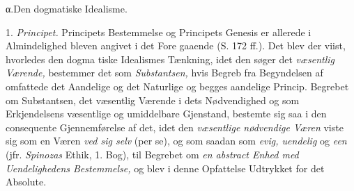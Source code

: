 %
\begin{center}α.\enspace Den dogmatiske Idealisme.\end{center}

1. \emph{Principet.} Principets Bestemmelse og Principets
Genesis er allerede i Almindelighed bleven angivet i det Fore\-%
gaaende (S. 172 ff.). Det blev der viist, hvorledes den dogma\-%
tiske Idealismes Tænkning, idet den søger det \emph{væsentlig
Værende,} bestemmer det som \emph{Substantsen,} hvis Begreb
fra Begyndelsen af omfattede det Aandelige og det Naturlige
og begges aandelige Princip. Begrebet om Substantsen, det
væsentlig Værende i dets Nødvendighed og som Erkjendelsens
væsentlige og umiddelbare Gjenstand, bestemte sig saa i den
consequente Gjennemførelse af det, idet den \emph{væsentlige
nødvendige Væren} viste sig som en Væren \emph{ved sig selv}
(per se), og som saadan som \emph{evig, uendelig} og \emph{een} (jfr.
\emph{Spinozas} Ethik, 1. Bog), til Begrebet om \emph{en abstract
Enhed med Uendelighedens Bestemmelse,} og blev i
denne Opfattelse Udtrykket for det Absolute.

